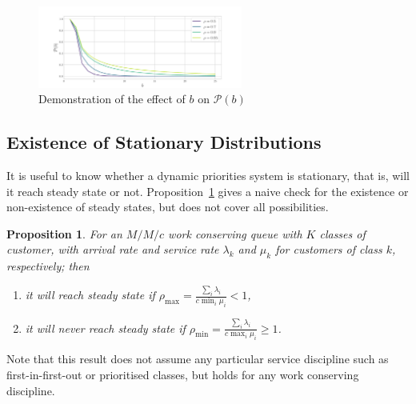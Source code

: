 \documentclass{article}
\newtheorem{prop}{Proposition}
\begin{document}
\begin{figure}
  \begin{center}
    \includegraphics[width=0.6\textwidth]{img/hitting_accuracy.pdf}
  \end{center}
  \caption{Demonstration of the effect of $b$ on $\mathcal{P}(b)$}
  \label{fig:hitting_accuracy}
\end{figure}



\subsection{Existence of Stationary Distributions}\label{sec:stationary}
It is useful to know whether a dynamic priorities system is stationary, that is,
will it reach steady state or not. Proposition~\ref{thrm:steadystate} gives a
naive check for the existence or non-existence of steady states, but does not
cover all possibilities.

\begin{prop}\label{thrm:steadystate}
For an $M/M/c$ work conserving queue with $K$ classes of customer, with arrival
rate and service rate $\lambda_k$ and  $\mu_k$ for customers of class $k$,
respectively; then
\begin{enumerate}
  \item it will reach steady state if
  $\rho_{\max} = \frac{\sum_i \lambda_i}{c \min_i \mu_i} < 1$,
  \item it will never reach steady state if
  $\rho_{\min} = \frac{\sum_i \lambda_i}{c \max_i \mu_i} \geq 1$.
\end{enumerate}
\end{prop}

Note that this result does not assume any particular service discipline such as
first-in-first-out or prioritised classes, but holds for any work conserving
discipline.
\end{document}
